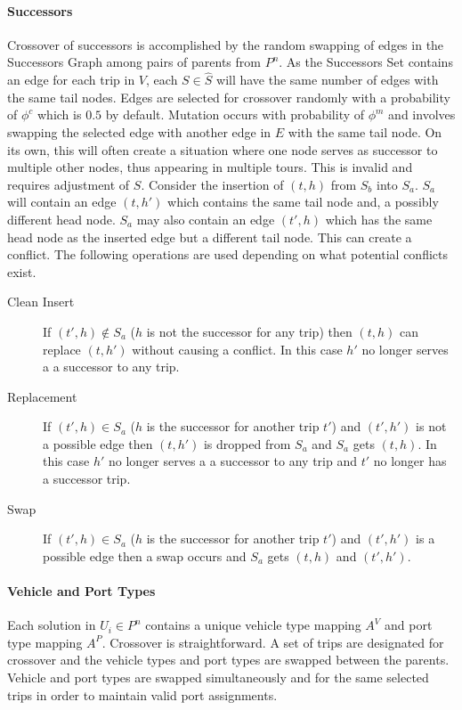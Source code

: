 \paragraph{Successors} Crossover of successors is accomplished by the random swapping of edges in the Successors Graph among pairs of parents from $P^n$. As the Successors Set contains an edge for each trip in $V$, each $S \in \hat{S}$ will have the same number of edges with the same tail nodes. Edges are selected for crossover randomly with a probability of $\phi^c$ which is $0.5$ by default. Mutation occurs with probability of $\phi^m$ and involves swapping the selected edge with another edge in $E$ with the same tail node. On its own, this will often create a situation where one node serves as successor to multiple other nodes, thus appearing in multiple tours. This is invalid and requires adjustment of $S$. Consider the insertion of $(t, h)$ from $S_b$ into $S_a$. $S_a$ will contain an edge $(t, h')$ which contains the same tail node and, a possibly different head node. $S_a$ may also contain an edge $(t', h)$ which has the same head node as the inserted edge but a different tail node. This can create a conflict. The following operations are used depending on what potential conflicts exist.

\begin{description}
	\item[Clean Insert] If $(t', h) \notin S_a$ ($h$ is not the successor for any trip) then $(t, h)$ can replace $(t, h')$ without causing a conflict. In this case $h'$ no longer serves a a successor to any trip.
	\item[Replacement] If $(t', h) \in S_a$ ($h$ is the successor for another trip $t'$) and $(t', h')$ is not a possible edge then $(t, h')$ is dropped from $S_a$ and $S_a$ gets $(t, h)$. In this case $h'$ no longer serves a a successor to any trip and $t'$ no longer has a successor trip.
	\item[Swap] If $(t', h) \in S_a$ ($h$ is the successor for another trip $t'$) and $(t', h')$ is a possible edge then a swap occurs and $S_a$ gets $(t, h)$ and $(t', h')$.
\end{description}

\paragraph{Vehicle and Port Types} Each solution in $U_i \in P^n$ contains a unique vehicle type mapping $A^V$ and port type mapping $A^P$. Crossover is straightforward. A set of trips are designated for crossover and the vehicle types and port types are swapped between the parents. Vehicle and port types are swapped simultaneously and for the same selected trips in order to maintain valid port assignments.

